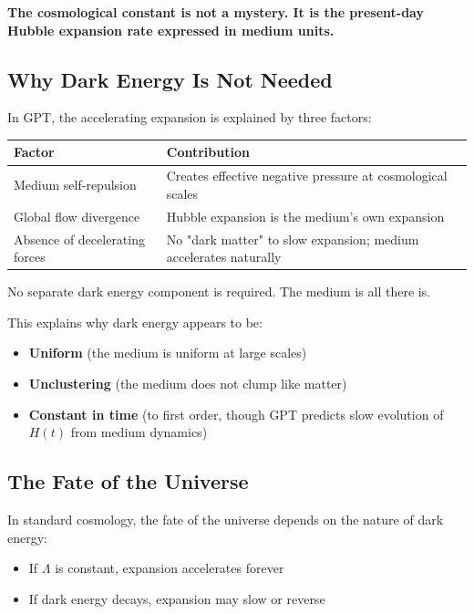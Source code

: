 \documentclass[12pt, a4paper]{article}
\begin{document}
\textbf{The cosmological constant is not a mystery. It is the present-day Hubble expansion rate expressed in medium units.}

\subsection{Why Dark Energy Is Not Needed}
\label{subsec:no_dark_energy}

In GPT, the accelerating expansion is explained by three factors:

\begin{center}
\begin{tabular}{|p{5cm}|p{9cm}|}
\hline
\textbf{Factor} & \textbf{Contribution} \\
\hline
Medium self-repulsion & Creates effective negative pressure at cosmological scales \\
\hline
Global flow divergence & Hubble expansion is the medium's own expansion \\
\hline
Absence of decelerating forces & No "dark matter" to slow expansion; medium accelerates naturally \\
\hline
\end{tabular}
\end{center}

No separate dark energy component is required. The medium is all there is.

This explains why dark energy appears to be:
\begin{itemize}
    \item \textbf{Uniform} (the medium is uniform at large scales)
    \item \textbf{Unclustering} (the medium does not clump like matter)
    \item \textbf{Constant in time} (to first order, though GPT predicts slow evolution of \( H(t) \) from medium dynamics)
\end{itemize}

\subsection{The Fate of the Universe}
\label{subsec:fate_universe}

In standard cosmology, the fate of the universe depends on the nature of dark energy:
\begin{itemize}
    \item If \( \Lambda \) is constant, expansion accelerates forever
    \item If dark energy decays, expansion may slow or reverse
\end{itemize}
\end{document}
